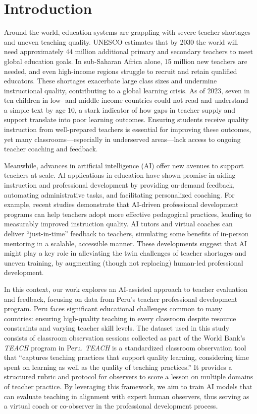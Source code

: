 \documentclass[12pt]{article}
\begin{document}
\section{Introduction}
\label{sec:intro}
\noindent Around the world, education systems are grappling with severe teacher shortages and uneven teaching quality. UNESCO estimates that by 2030 the world will need approximately 44 million additional primary and secondary teachers to meet global education goals. In sub-Saharan Africa alone, 15 million new teachers are needed, and even high-income regions struggle to recruit and retain qualified educators. These shortages exacerbate large class sizes and undermine instructional quality, contributing to a global learning crisis. As of 2023, seven in ten children in low- and middle-income countries could not read and understand a simple text by age 10, a stark indicator of how gaps in teacher supply and support translate into poor learning outcomes. Ensuring students receive quality instruction from well-prepared teachers is essential for improving these outcomes, yet many classrooms—especially in underserved areas—lack access to ongoing teacher coaching and feedback.

Meanwhile, advances in artificial intelligence (AI) offer new avenues to support teachers at scale. AI applications in education have shown promise in aiding instruction and professional development by providing on-demand feedback, automating administrative tasks, and facilitating personalized coaching. For example, recent studies demonstrate that AI-driven professional development programs can help teachers adopt more effective pedagogical practices, leading to measurably improved instruction quality. AI tutors and virtual coaches can deliver “just-in-time” feedback to teachers, simulating some benefits of in-person mentoring in a scalable, accessible manner. These developments suggest that AI might play a key role in alleviating the twin challenges of teacher shortages and uneven training, by augmenting (though not replacing) human-led professional development.

In this context, our work explores an AI-assisted approach to teacher evaluation and feedback, focusing on data from Peru’s teacher professional development program. Peru faces significant educational challenges common to many countries: ensuring high-quality teaching in every classroom despite resource constraints and varying teacher skill levels. The dataset used in this study consists of classroom observation sessions collected as part of the World Bank’s \textit{TEACH} program in Peru. \textit{TEACH} is a standardized classroom observation tool that “captures teaching practices that support quality learning, considering time spent on learning as well as the quality of teaching practices.” It provides a structured rubric and protocol for observers to score a lesson on multiple domains of teacher practice. By leveraging this framework, we aim to train AI models that can evaluate teaching in alignment with expert human observers, thus serving as a virtual coach or co-observer in the professional development process.
\end{document}
